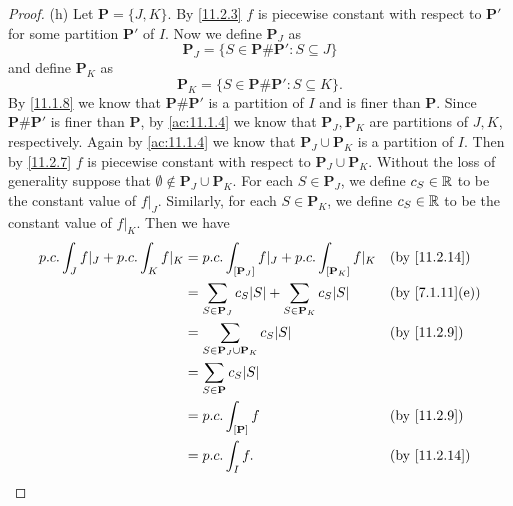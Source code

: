 \begin{proof}{(h)}
  Let \(\mathbf{P} = \{J, K\}\).
  By \cref{11.2.3} \(f\) is piecewise constant with respect to \(\mathbf{P}'\) for some partition \(\mathbf{P}'\) of \(I\).
  Now we define \(\mathbf{P}_J\) as
  \[
    \mathbf{P}_J = \{S \in \mathbf{P} \# \mathbf{P}' : S \subseteq J\}
  \]
  and define \(\mathbf{P}_K\) as
  \[
    \mathbf{P}_K = \{S \in \mathbf{P} \# \mathbf{P}' : S \subseteq K\}.
  \]
  By \cref{11.1.8} we know that \(\mathbf{P} \# \mathbf{P}'\) is a partition of \(I\) and is finer than \(\mathbf{P}\).
  Since \(\mathbf{P} \# \mathbf{P}'\) is finer than \(\mathbf{P}\), by \cref{ac:11.1.4} we know that \(\mathbf{P}_J, \mathbf{P}_K\) are partitions of \(J, K\), respectively.
  Again by \cref{ac:11.1.4} we know that \(\mathbf{P}_J \cup \mathbf{P}_K\) is a partition of \(I\).
  Then by \cref{11.2.7} \(f\) is piecewise constant with respect to \(\mathbf{P}_J \cup \mathbf{P}_K\).
  Without the loss of generality suppose that \(\emptyset \notin \mathbf{P}_J \cup \mathbf{P}_K\).
  For each \(S \in \mathbf{P}_J\), we define \(c_S \in \mathbb{R}\) to be the constant value of \(f|_J\).
  Similarly, for each \(S \in \mathbf{P}_K\), we define \(c_S \in \mathbb{R}\) to be the constant value of \(f|_K\).
  Then we have
  \begin{align*}
    p.c. \int_J f|_J + p.c. \int_K f|_K & = p.c. \int_{[\mathbf{P}_J]} f|_J + p.c. \int_{[\mathbf{P}_K]} f|_K             &  & \text{(by \cref{11.2.14})}   \\
                                        & = \sum_{S \in \mathbf{P}_J} c_S \abs{S} + \sum_{S \in \mathbf{P}_K} c_S \abs{S} &  & \text{(by \cref{7.1.11}(e))} \\
                                        & = \sum_{S \in \mathbf{P}_J \cup \mathbf{P}_K} c_S \abs{S}                       &  & \text{(by \cref{11.2.9})}    \\
                                        & = \sum_{S \in \mathbf{P}} c_S \abs{S}                                                                             \\
                                        & = p.c. \int_{[\mathbf{P}]} f                                                    &  & \text{(by \cref{11.2.9})}    \\
                                        & = p.c. \int_I f.                                                                &  & \text{(by \cref{11.2.14})}
  \end{align*}
\end{proof}

